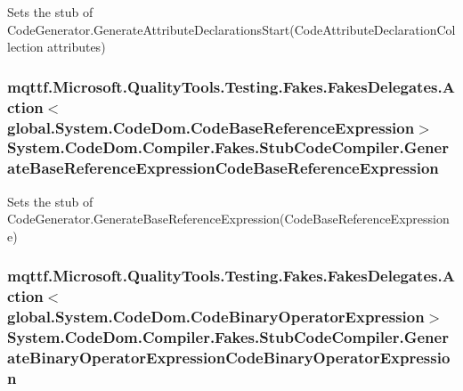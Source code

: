 Sets the stub of Code\-Generator.\-Generate\-Attribute\-Declarations\-Start(\-Code\-Attribute\-Declaration\-Collection attributes)

\hypertarget{class_system_1_1_code_dom_1_1_compiler_1_1_fakes_1_1_stub_code_compiler_a96e3b05301c833896247f44cff56c426}{
\subsubsection[{Generate\-Base\-Reference\-Expression\-Code\-Base\-Reference\-Expression}]{\setlength{\rightskip}{0pt plus 5cm}mqttf.\-Microsoft.\-Quality\-Tools.\-Testing.\-Fakes.\-Fakes\-Delegates.\-Action$<$global.\-System.\-Code\-Dom.\-Code\-Base\-Reference\-Expression$>$ System.\-Code\-Dom.\-Compiler.\-Fakes.\-Stub\-Code\-Compiler.\-Generate\-Base\-Reference\-Expression\-Code\-Base\-Reference\-Expression}}\label{class_system_1_1_code_dom_1_1_compiler_1_1_fakes_1_1_stub_code_compiler_a96e3b05301c833896247f44cff56c426}


Sets the stub of Code\-Generator.\-Generate\-Base\-Reference\-Expression(\-Code\-Base\-Reference\-Expression e)

\hypertarget{class_system_1_1_code_dom_1_1_compiler_1_1_fakes_1_1_stub_code_compiler_a583a6c68f093312b3180b65f6382f067}{
\subsubsection[{Generate\-Binary\-Operator\-Expression\-Code\-Binary\-Operator\-Expression}]{\setlength{\rightskip}{0pt plus 5cm}mqttf.\-Microsoft.\-Quality\-Tools.\-Testing.\-Fakes.\-Fakes\-Delegates.\-Action$<$global.\-System.\-Code\-Dom.\-Code\-Binary\-Operator\-Expression$>$ System.\-Code\-Dom.\-Compiler.\-Fakes.\-Stub\-Code\-Compiler.\-Generate\-Binary\-Operator\-Expression\-Code\-Binary\-Operator\-Expression}}\label{class_system_1_1_code_dom_1_1_compiler_1_1_fakes_1_1_stub_code_compiler_a583a6c68f093312b3180b65f6382f067}


